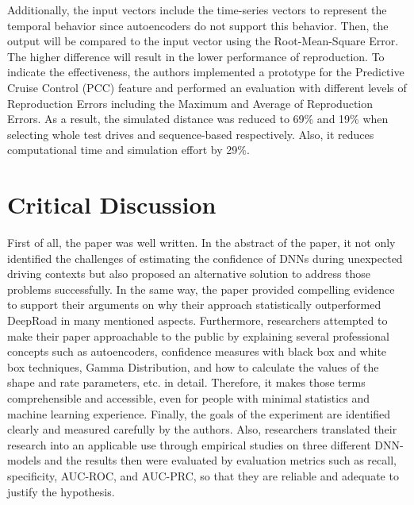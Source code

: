 \documentclass[10pt,a4paper]{report}
\begin{document}
%
Additionally, the input vectors include the time-series vectors to represent the temporal behavior since autoencoders do not support this behavior.
%
Then, the output will be compared to the input vector using the Root-Mean-Square Error.
%
The higher difference will result in the lower performance of reproduction.
%
To indicate the effectiveness, the authors implemented a prototype for the Predictive Cruise Control (PCC) feature and performed an evaluation with different levels of Reproduction Errors including the Maximum and Average of Reproduction Errors.
%
As a result, the simulated distance was reduced to 69\% and 19\% when selecting whole test drives and sequence-based respectively. Also, it reduces computational time and simulation effort by 29\%.


\section{Critical Discussion}
First of all, the paper was well written. In the abstract of the paper, it not only identified the challenges of estimating the confidence of DNNs during unexpected driving contexts but also proposed an alternative solution to address those problems successfully. 
%
In the same way, the paper provided compelling evidence to support their arguments on why their approach statistically outperformed DeepRoad in many mentioned aspects. 
%
Furthermore, researchers attempted to make their paper approachable to the public by explaining several professional concepts such as autoencoders, confidence measures with black box and white box techniques, Gamma Distribution, and how to calculate the values of the shape and rate parameters, etc. in detail. 
%
Therefore, it makes those terms comprehensible and accessible, even for people with minimal statistics and machine learning experience.
%
Finally, the goals of the experiment are identified clearly and measured carefully by the authors. 
%
Also, researchers translated their research into an applicable use through empirical studies on three different DNN-models and the results then were evaluated by evaluation metrics such as recall, specificity, AUC-ROC, and AUC-PRC, so that they are reliable and adequate to justify the hypothesis.
%
\end{document}
